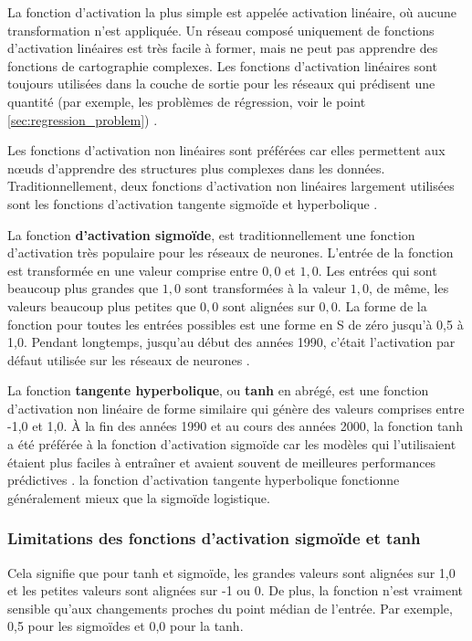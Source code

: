 	La fonction d'activation la plus simple est appelée activation linéaire, où aucune transformation n'est appliquée. Un réseau composé uniquement de fonctions d'activation linéaires est très facile à former, mais ne peut pas apprendre des fonctions de cartographie complexes. Les fonctions d'activation linéaires sont toujours utilisées dans la couche de sortie pour les réseaux qui prédisent une quantité (par exemple, les problèmes de régression, voir le point \ref{sec:regression_problem}) \cite{geron2017hands, krizhevsky2012imagenet}.
	
	Les fonctions d'activation non linéaires sont préférées car elles permettent aux nœuds d'apprendre des structures plus complexes dans les données. Traditionnellement, deux fonctions d'activation non linéaires largement utilisées sont les fonctions d'activation tangente sigmoïde et hyperbolique \cite{goodfellow2016deep}.
	
	La fonction \textbf{d'activation sigmoïde}, est traditionnellement une fonction d'activation très populaire pour les réseaux de neurones. L'entrée de la fonction est transformée en une valeur comprise entre $0,0$ et $1,0$. Les entrées qui sont beaucoup plus grandes que $1,0$ sont transformées à la valeur $1,0$, de même, les valeurs beaucoup plus petites que $0,0$ sont alignées sur $0,0$. La forme de la fonction pour toutes les entrées possibles est une forme en S de zéro jusqu'à 0,5 à 1,0. Pendant longtemps, jusqu'au début des années 1990, c'était l'activation par défaut utilisée sur les réseaux de neurones \cite{krizhevsky2012imagenet}.
	
	
	La fonction \textbf{tangente hyperbolique}, ou \textbf{tanh} en abrégé, est une fonction d'activation non linéaire de forme similaire qui génère des valeurs comprises entre -1,0 et 1,0. À la fin des années 1990 et au cours des années 2000, la fonction tanh a été préférée à la fonction d'activation sigmoïde car les modèles qui l'utilisaient étaient plus faciles à entraîner et avaient souvent de meilleures performances prédictives \cite{goodfellow2016deep}.
	la fonction d'activation tangente hyperbolique fonctionne généralement mieux que la sigmoïde logistique.
	\subsubsection*{Limitations des fonctions d'activation sigmoïde et tanh}
	Cela signifie que pour tanh et sigmoïde, les grandes valeurs sont alignées sur 1,0 et les petites valeurs sont alignées sur -1 ou 0. De plus, la fonction n'est vraiment sensible qu'aux changements proches du point médian de l'entrée. Par exemple, 0,5 pour les sigmoïdes et 0,0 pour la tanh.
	
